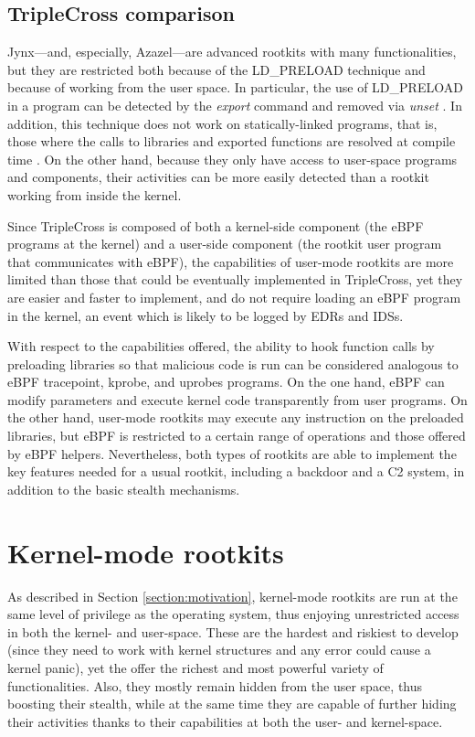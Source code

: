 \subsection{TripleCross comparison}
Jynx---and, especially, Azazel---are advanced rootkits with many
functionalities, but they are restricted both because of the LD\_PRELOAD
technique and because of working from the user space.
%
In particular, the use of LD\_PRELOAD in a program can be detected by the
\textit{export} command and removed via \textit{unset}
\cite{ld_preload_detect}. In addition, this technique does not work on
statically-linked programs, that is, those where the calls to libraries
and exported functions are resolved at compile time \cite{ldpreload_pros}.
On the other hand, because they only have access to user-space programs and
components, their activities can be more easily detected than a rootkit
working from inside the kernel.

Since TripleCross is composed of both a kernel-side component (the eBPF
programs at the kernel) and a user-side component (the rootkit user program
that communicates with eBPF), the capabilities of user-mode rootkits are
more limited than those that could be eventually implemented in
TripleCross, yet they are easier and faster to implement, and do not
require loading an eBPF program in the kernel, an event which is likely to
be logged by EDRs and IDSs.

With respect to the capabilities offered, the ability to hook function
calls by preloading libraries so that malicious code is run can be
considered analogous to eBPF tracepoint, kprobe, and uprobes programs. On
the one hand, eBPF can modify parameters and execute kernel code
transparently from user programs. On the other hand, user-mode
rootkits may execute any instruction on the preloaded libraries, but eBPF
is restricted to a certain range of operations and those offered by eBPF
helpers. Nevertheless, both types of rootkits are able to implement the key
features needed for a usual rootkit, including a backdoor and a C2 system,
in addition to the basic stealth mechanisms.

\section{Kernel-mode rootkits}
As described in Section \ref{section:motivation}, kernel-mode
rootkits are run at the same level of privilege as the operating system,
thus enjoying unrestricted access in both the kernel- and user-space. These
are the hardest and riskiest to develop (since they need to work with
kernel structures and any error could cause a kernel panic), yet the offer
the richest and most powerful variety of functionalities. Also, they mostly
remain hidden from the user space, thus boosting their stealth, while at
the same time they are capable of further hiding their activities thanks
to their capabilities at both the user- and kernel-space.

